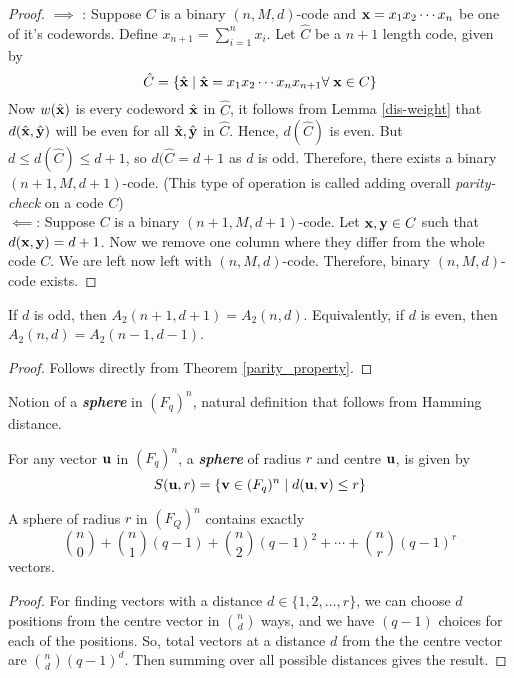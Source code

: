 \documentclass[../main.tex]{subfiles}
\begin{document}
\begin{proof}
	$\implies$ :
	Suppose $C$ is a binary $(n,M,d)$-code and $\textbf{x} = x_1x_2\cdots x_n$ be one of it's codewords. Define
	\(
		x_{n+1} = \sum_{i=1}^{n}x_i
	\).
	Let $\hat{C}$ be a $n+1$ length code, given by
	\[
		\hat{C} = \{\hat{\textbf{x}}\; |\; \hat{\textbf{x}} = x_1x_2\cdots x_nx_{n+1} \forall\; \textbf{x}\in C\} 
	\]
	Now $w(\hat{\textbf{x}})$ is every codeword $\hat{\textbf{x}}$ in $\hat{C}$, it follows from Lemma \ref{dis-weight} that $d(\hat{\textbf{x}}, \hat{\textbf{y}})$ will be even for all $\hat{\textbf{x}}, \hat{\textbf{y}}$ in $\hat{C}$. Hence, $d(\hat{C})$ is even. But $d\leq d(\hat{C})\leq d+1$, so $d(\hat{C}=d+1$ as $d$ is odd. Therefore, there exists a binary $(n+1,M,d+1)$-code. (This type of operation is called adding overall \emph{parity-check} on a code $C$)\\
	$\impliedby$:
	Suppose $C$ is a binary $(n+1,M,d+1)$-code. Let $\textbf{x}, \textbf{y} \in C$ such that $d(\textbf{x},\textbf{y}) = d+1$. Now we remove one column where they differ from the whole code $C$. We are left now left with $(n,M,d)$-code. Therefore, binary $(n,M,d)$-code exists.
\end{proof}

\begin{cor}\label{odd/even_maxM}
	If $d$ is odd, then $A_2(n+1,d+1)=A_2(n,d)$. Equivalently, if $d$ is even, then $A_2(n,d)=A_2(n-1,d-1)$.
\end{cor}
\begin{proof}
	Follows directly from Theorem \ref{parity_property}.
\end{proof}

Notion of a \textbf{\emph{sphere}} in $(F_q)^n$, natural definition that follows from Hamming distance.
\begin{defn}
	For any vector $\textbf{u}$ in $(F_q)^n$, a \textbf{\emph{sphere}} of radius $r$ and centre $\textbf{u}$, is given by
	\[
		S(\textbf{u}, r)= \{\textbf{v}\in (F_q)^n\; |\; d(\textbf{u},\textbf{v}) \leq r \}
	\] 
\end{defn}

\begin{lem}
	A sphere of radius $r$ in $(F_Q)^n$ contains exactly
	\[
		\binom{n}{0}+\binom{n}{1}(q-1)+\binom{n}{2}(q-1)^2+\cdots+\binom{n}{r}(q-1)^r
	\]
	vectors.
\end{lem}

\begin{proof}
	For finding vectors with a distance $d \in \{1,2,\ldots,r\}$, we can choose $d$ positions from the centre vector in $\binom{n}{d}$ ways, and we have $(q-1)$ choices for each of the positions. So, total vectors at a distance $d$ from the the centre vector are $\binom{n}{d}(q-1)^d$. Then summing over all possible distances gives the result.
\end{proof}
\end{document}
